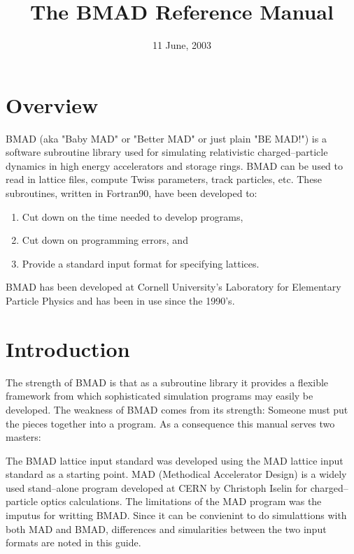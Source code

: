 \documentclass{book}
\begin{document}
\title{The BMAD Reference Manual}

\date{11 June, 2003}
\maketitle

\section*{Overview}

BMAD (aka "Baby MAD" or "Better MAD" or just plain "BE MAD!")
is a software subroutine library used for simulating 
relativistic charged--particle dynamics in high energy accelerators
and storage rings. BMAD can be used to read in lattice files, compute 
Twiss parameters, track particles, etc. 
These subroutines, written in  Fortran90, have been developed to:
\begin{enumerate}
\item Cut down on the time needed to develop programs,
\item Cut down on programming errors, and
\item Provide a standard input format for specifying lattices.
\end{enumerate}
BMAD has been developed at Cornell University's Laboratory for Elementary
Particle Physics and has been in use since the 1990's.

\break
\section*{Introduction}

The strength of BMAD is that as a subroutine library it provides a flexible
framework from which sophisticated simulation programs may easily be developed.
The weakness of BMAD comes from its strength: Someone must put the pieces 
together into a program. As a consequence this manual serves two masters:

The BMAD lattice input standard was developed using the MAD lattice input 
standard as a starting point. MAD (Methodical Accelerator Design) is a 
widely used
stand--alone program developed at CERN by Christoph Iselin for charged--particle 
optics calculations. The limitations of the MAD program was the imputus for
writting BMAD. Since it can be convienint to do simulattions with both MAD and
BMAD, differences and simularities between the two input formats are noted in
this guide.
\end{document}
